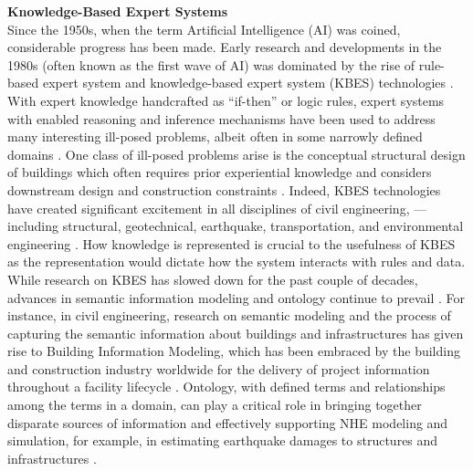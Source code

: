 \noindent\textbf{Knowledge-Based Expert Systems} \\Since the 1950s, when the term Artificial Intelligence (AI) was coined, considerable progress has been made. Early research and developments in the 1980s (often known as the first wave of AI) was dominated by the rise of rule-based expert system and knowledge-based expert system (KBES) technologies \citep{hayes-roth1983building}. With expert knowledge handcrafted as ``if-then'' or logic rules, expert systems with enabled reasoning and inference mechanisms have been used to address many interesting ill-posed problems, albeit often in some narrowly defined domains \citep{simon1973structure}. One class of ill-posed problems arise is the conceptual structural design of buildings which often requires prior experiential knowledge and considers downstream design and construction constraints \citep{sriram1985knowledgebased,kumar1997cadrem, jain1991formal-i, jain1991formal-ii}. Indeed, KBES technologies have created significant excitement in all disciplines of civil engineering, —including structural, geotechnical, earthquake, transportation, and environmental engineering \citep{kostem1986expert,palmer1987special,dym1991knowledgebased,cohn1992knowledgebased,sriram1997intelligent}. How knowledge is represented is crucial to the usefulness of KBES as the representation would dictate how the system interacts with rules and data. While research on KBES has slowed down for the past couple of decades, advances in semantic information modeling and ontology continue to prevail \citep{stevens2000ontologybased,noy2009bioportal}. For instance, in civil engineering, research on semantic modeling and the process of capturing the semantic information about buildings and infrastructures has given rise to Building Information Modeling, which has been embraced by the building and construction industry worldwide for the delivery of project information throughout a facility lifecycle \citep{sacks2018bim}. Ontology, with defined terms and relationships among the terms in a domain, can play a critical role in bringing together disparate sources of information and effectively supporting NHE modeling and simulation, for example, in estimating earthquake damages to structures and infrastructures \citep{yu2016image}.
\newline
 
